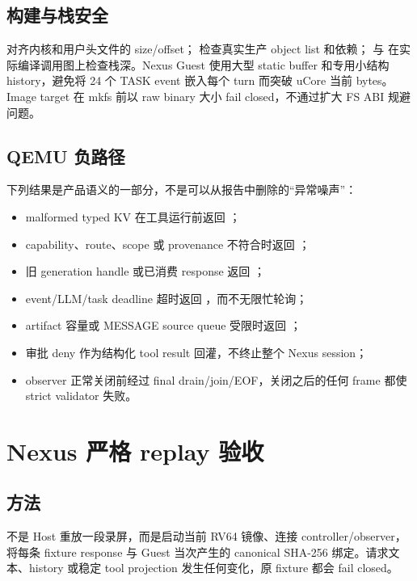 \subsection{构建与栈安全}

 对齐内核和用户头文件的 size/offset； 检查真实生产 object list 和依赖； 与  在实际编译调用图上检查栈深。Nexus Guest 使用大型 static buffer 和专用小结构 history，避免将 24 个 TASK event 嵌入每个 turn 而突破 uCore 当前  bytes。Image target 在 mkfs 前以 raw binary 大小 fail closed，不通过扩大 FS ABI 规避问题。

\subsection{QEMU 负路径}

下列结果是产品语义的一部分，不是可以从报告中删除的“异常噪声”：

\begin{itemize}
  \item malformed typed KV 在工具运行前返回 ；
  \item capability、route、scope 或 provenance 不符合时返回 ；
  \item 旧 generation handle 或已消费 response 返回 ；
  \item event/LLM/task deadline 超时返回 ，而不无限忙轮询；
  \item artifact 容量或 MESSAGE source queue 受限时返回 ；
  \item 审批 deny 作为结构化 tool result 回灌，不终止整个 Nexus session；
  \item observer 正常关闭前经过 final drain/join/EOF，关闭之后的任何 frame 都使 strict validator 失败。
\end{itemize}

\section{Nexus 严格 replay 验收}

\subsection{方法}

 不是 Host 重放一段录屏，而是启动当前 RV64 镜像、连接 controller/observer，将每条 fixture response 与 Guest 当次产生的 canonical  SHA-256 绑定。请求文本、history 或稳定 tool projection 发生任何变化，原 fixture 都会 fail closed。

